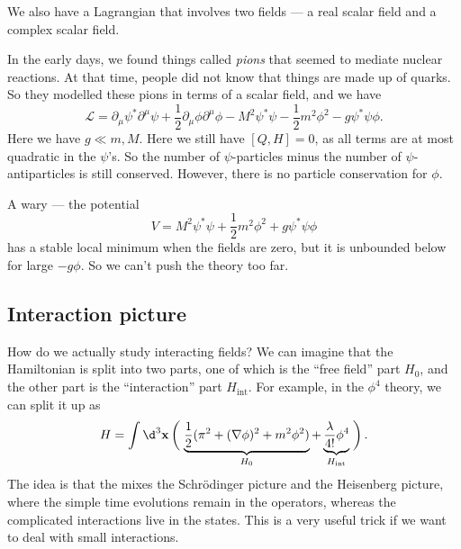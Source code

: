 \documentclass[a4paper]{article}
\begin{document}
We also have a Lagrangian that involves two fields --- a real scalar field and a complex scalar field.
\begin{eg}
  In the early days, we found things called \emph{pions} that seemed to mediate nuclear reactions. At that time, people did not know that things are made up of quarks. So they modelled these pions in terms of a scalar field, and we have
  \[
    \mathcal{L} = \partial_\mu \psi^* \partial^\mu \psi + \frac{1}{2} \partial_\mu \phi \partial^\mu \phi - M^2 \psi^* \psi - \frac{1}{2} m^2 \phi^2 - g \psi^* \psi \phi.
  \]
  Here we have $g \ll m, M$. Here we still have $[Q, H] = 0$, as all terms are at most quadratic in the $\psi$'s. So the number of $\psi$-particles minus the number of $\psi$-antiparticles is still conserved. However, there is no particle conservation for $\phi$.

  A wary --- the potential
  \[
    V = M^2 \psi^* \psi + \frac{1}{2} m^2 \phi^2 + g \psi^*\psi \phi
  \]
  has a stable local minimum when the fields are zero, but it is unbounded below for large $-g \phi$. So we can't push the theory too far.
\end{eg}

\subsection{Interaction picture}
How do we actually study interacting fields? We can imagine that the Hamiltonian is split into two parts, one of which is the ``free field'' part $H_0$, and the other part is the ``interaction'' part $H_{\mathrm{int}}$. For example, in the $\phi^4$ theory, we can split it up as
\[
  H = \int\d^3 \mathbf{x} \left(\vphantom{\frac{\lambda}{4}}\right.\underbrace{\frac{1}{2} (\pi^2 + (\nabla \phi)^2 + m^2 \phi^2)}_{H_0} + \underbrace{\frac{\lambda}{4!} \phi^4}_{H_{\mathrm{int}}}\left.\vphantom{\frac{\lambda}{4!}}\right).
\]
The idea is that the  mixes the Schr\"odinger picture and the Heisenberg picture, where the simple time evolutions remain in the operators, whereas the complicated interactions live in the states. This is a very useful trick if we want to deal with small interactions.
\end{document}
